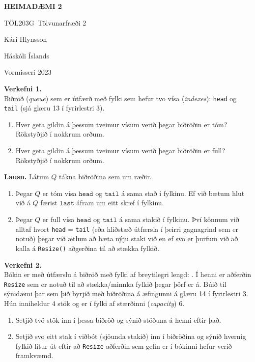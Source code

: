 \documentclass[a4paper, 12pt]{article}
\newcommand{\doctitle}{\uppercase{HEIMADÆMI 2}}
\newcommand{\coursename}{Tölvunarfræði 2}
\newcommand{\coursenum}{TÖL203G}
\begin{document}
\vspace*{.5cm}
\centerline{\bfseries\Large\doctitle}
\medskip
\centerline{\large\coursenum\ \coursename}
\bigskip
\bigskip
\centerline{\large Kári Hlynsson}
\bigskip
\centerline{Háskóli Íslands}
\medskip
\centerline{Vormisseri 2023}
\bigskip
\bigskip

\large

\noindent
\textbf{Verkefni 1.} \\
Biðröð (\emph{queue}) sem er útfærð með fylki sem hefur tvo vísa (\emph{indexes}): \texttt{head}
og \texttt{tail} (sjá glæru 13 í fyrirlestri 3).

\begin{enumerate}[label=(\alph*)]
  \item Hver geta gildin á þessum tveimur vísum verið þegar biðröðin er tóm? Rökstyðjið í nokkrum orðum.
  \item Hver geta gildin á þessum tveimur vísum verið þegar biðröðin er full? Rökstyðjið í nokkrum orðum.
\end{enumerate}

\noindent
\textbf{Lausn.} Látum $Q$ tákna biðröðina sem um ræðir.

\begin{enumerate}[label=(\alph*)]
  \item Þegar $Q$ er tóm vísa $\texttt{head}$ og $\texttt{tail}$ á sama stað í fylkinu. Ef við bætum hlut við á $Q$ færist $\texttt{last}$ áfram um eitt skref í fylkinu.

  \item Þegar $Q$ er full vísa $\texttt{head}$ og $\texttt{tail}$ á sama stakið í fylkinu. Því könnum við alltaf hvort \texttt{head} = \texttt{tail} (eða hliðstæð útfærsla í þeirri
  gagnagrind sem er notuð) þegar við ætlum að bæta nýju staki við en ef svo er þurfum við að kalla á \texttt{Resize()} aðgerðina til að stækka fylkið.
\end{enumerate}

\newpage

\noindent
\textbf{Verkefni 2.} \\
Bókin er með útfærslu á biðröð með fylki af breytilegri lengd: \texttt{}. Í henni er aðferðin \texttt{Resize} sem er notuð til að stækka/minnka
fylkið þegar þörf er á. Búið til sýnidæmi þar sem þið byrjið með biðröðina á æfingunni á glæru 14 í fyrirlestri 3. Hún inniheldur 4 stök og er í fylki af stærðinni (\emph{capacity})
6.

\begin{enumerate}[label=(\alph*)]
  \item Setjið tvö stök inn í þessa biðröð og sýnið stöðuna á henni eftir það.
  \item Setjið svo eitt stak í viðbót (sjöunda stakið) inn í biðröðina og sýnið hvernig fylkið lítur út eftir
    að \texttt{Resize} aðferðin sem gefin er í bókinni hefur verið framkvæmd.
\end{enumerate}
\end{document}
